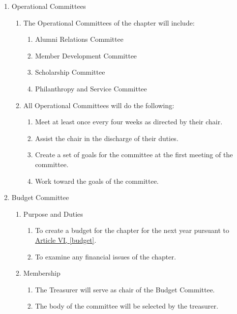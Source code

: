 \begin{enumerate}
\begin{enumerate}
			\item Operational Committees \label{op-comm}
				\begin{enumerate}
					\item The Operational Committees of the chapter will include:

						\begin{enumerate}
							\item Alumni Relations Committee
							\item Member Development Committee
							\item Scholarship Committee
							\item Philanthropy and Service Committee
						\end{enumerate}

					\item All Operational Committees will do the following:
						\begin{enumerate}
							\item Meet at least once every four weeks as directed by their chair.
							\item Assist the chair in the discharge of their duties.
							\item Create a set of goals for the committee at the first meeting of the committee.
							\item Work toward the goals of the committee.
						\end{enumerate}
				\end{enumerate}

			\item Budget Committee
				\label{budget-committee}
				\begin{enumerate}
					\item Purpose and Duties
						\begin{enumerate}
							\item To create a budget for the chapter for the next year pursuant to \hyperref[budget]{Article VI, \autoref*{budget}}.
							\item To examine any financial issues of the chapter.
						\end{enumerate}

					\item Membership
						\begin{enumerate}
							\item The Treasurer will serve as chair of the Budget Committee.
							\item The body of the committee will be selected by the treasurer.
						\end{enumerate}


\end{enumerate}
\end{enumerate}
\end{enumerate}
